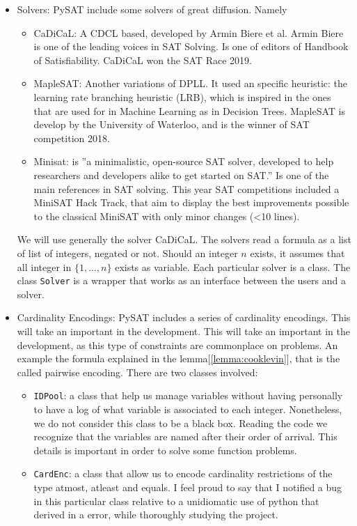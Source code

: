 \begin{itemize}
\item Solvers:  PySAT include some solvers of great diffusion. Namely
  \begin{itemize}
  \item CaDiCaL: A CDCL based, developed by Armin Biere et al. Armin Biere is one of the leading voices in SAT Solving. Is one of editors of Handbook of Satisfiability. CaDiCaL won the SAT Race 2019.
  \item MapleSAT: Another variations of DPLL. It used an specific heuristic: the learning rate branching heuristic (LRB), which is inspired in the ones that are used for in Machine Learning as in Decision Trees. MapleSAT is develop by the University of Waterloo, and is the winner of SAT competition 2018.
  \item Minisat: is ''a minimalistic, open-source SAT solver, developed to help researchers and developers alike to get started on SAT.'' Is one of the main references in SAT solving. This year SAT competitions included a MiniSAT Hack Track, that aim to display the best improvements possible to the classical MiniSAT with only minor changes (<10 lines).
  \end{itemize}

  We will use generally the solver CaDiCaL. The solvers read a formula as a list of list of integers, negated or not. Should an integer $n$ exists, it assumes that all integer in $\{1,...,n\}$ exists as variable. Each particular solver is a class. The class \texttt{Solver} is a wrapper that works as an interface between the users and a solver. 


  
\item Cardinality Encodings: PySAT includes a series of cardinality encodings. This will take an important in the development. This will take an important in the development, as this type of constraints are commonplace on problems. An example the formula explained in the lemma[\ref{lemma:cooklevin}], that is the called pairwise encoding. There are two classes involved:
  \begin{itemize}
  \item \texttt{IDPool}: a class that help us manage variables without having personally to have a log of what variable is associated to each integer. Nonetheless, we do not consider this class to be a black box. Reading the code we recognize that the variables are named after their order of arrival. This details is important in order to solve some function problems.
  \item \texttt{CardEnc}: a class that allow us to encode cardinality restrictions of the type atmost, atleast and equals. I feel proud to say that I notified a bug in this particular class relative to a unidiomatic use of python that derived in a error, while thoroughly studying the project.  
  \end{itemize}

\end{itemize}


